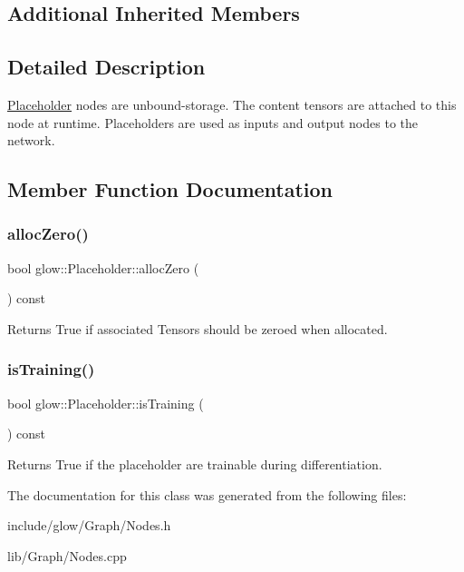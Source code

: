 \subsection*{Additional Inherited Members}


\subsection{Detailed Description}
\hyperlink{classglow_1_1_placeholder}{Placeholder} nodes are unbound-\/storage. The content tensors are attached to this node at runtime. Placeholders are used as inputs and output nodes to the network. 

\subsection{Member Function Documentation}
\mbox{\label{classglow_1_1_placeholder_a037101fe1379191f958f4f6ddcfbd1fb}} 
\subsubsection{\texorpdfstring{alloc\+Zero()}{allocZero()}}
{\footnotesize\ttfamily bool glow\+::\+Placeholder\+::alloc\+Zero (\begin{DoxyParamCaption}{ }\end{DoxyParamCaption}) const\hspace{0.3cm}{\ttfamily [inline]}}

\begin{DoxyReturn}{Returns}
True if associated Tensors should be zeroed when allocated. 
\end{DoxyReturn}
\mbox{\label{classglow_1_1_placeholder_ae55a57afde49e54d9f6a210f083645f1}} 
\subsubsection{\texorpdfstring{is\+Training()}{isTraining()}}
{\footnotesize\ttfamily bool glow\+::\+Placeholder\+::is\+Training (\begin{DoxyParamCaption}{ }\end{DoxyParamCaption}) const\hspace{0.3cm}{\ttfamily [inline]}}

\begin{DoxyReturn}{Returns}
True if the placeholder are trainable during differentiation. 
\end{DoxyReturn}


The documentation for this class was generated from the following files\+:\begin{DoxyCompactItemize}
\item 
include/glow/\+Graph/Nodes.\+h\item 
lib/\+Graph/Nodes.\+cpp\end{DoxyCompactItemize}
